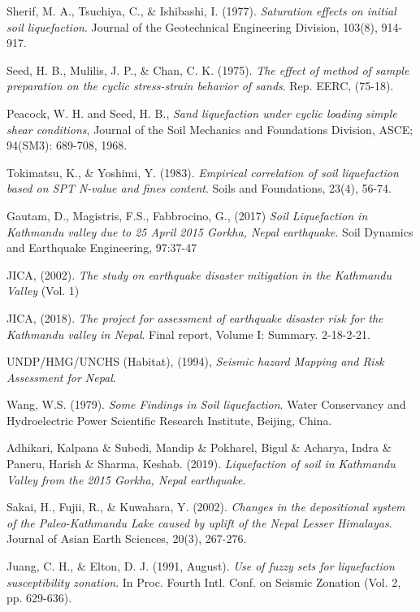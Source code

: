 \begin{thebibliography}{99}
Sherif, M. A., Tsuchiya, C., \& Ishibashi, I. (1977). \emph{Saturation effects on initial soil liquefaction}. Journal of the Geotechnical Engineering Division, 103(8), 914-917.

Seed, H. B., Mulilis, J. P., \& Chan, C. K. (1975). \emph{The effect of method of sample preparation on the cyclic stress-strain behavior of sands}. Rep. EERC, (75-18).

Peacock, W. H. and Seed, H. B., \emph{Sand liquefaction under cyclic loading simple shear conditions}, Journal of the Soil Mechanics and Foundations Division, ASCE; 94(SM3): 689-708, 1968.

Tokimatsu, K., \& Yoshimi, Y. (1983). \emph{Empirical correlation of soil liquefaction based on SPT N-value and fines content}. Soils and Foundations, 23(4), 56-74.

Gautam, D., Magistris, F.S., Fabbrocino, G., (2017) \emph{Soil Liquefaction in Kathmandu valley due to 25 April 2015 Gorkha, Nepal earthquake}. Soil Dynamics and Earthquake Engineering, 97:37-47

JICA, (2002). \emph{The study on earthquake disaster mitigation in the Kathmandu Valley} (Vol. 1)

JICA, (2018). \emph{The project for assessment of earthquake disaster risk for the Kathmandu valley in Nepal}. Final report, Volume I: Summary. 2-18-2-21.

UNDP/HMG/UNCHS (Habitat), (1994), \emph{Seismic hazard Mapping and Risk Assessment for Nepal}.

Wang, W.S. (1979). \emph{Some Findings in Soil liquefaction}. Water Conservancy and Hydroelectric Power Scientific Research Institute, Beijing, China.

Adhikari, Kalpana \& Subedi, Mandip \& Pokharel, Bigul \& Acharya, Indra \& Paneru, Harish \& Sharma, Keshab. (2019). \emph{Liquefaction of soil in Kathmandu Valley from the 2015 Gorkha, Nepal earthquake}.

Sakai, H., Fujii, R., \& Kuwahara, Y. (2002). \emph{Changes in the depositional system of the Paleo-Kathmandu Lake caused by uplift of the Nepal Lesser Himalayas}. Journal of Asian Earth Sciences, 20(3), 267-276.

Juang, C. H., \& Elton, D. J. (1991, August). \emph{Use of fuzzy sets for liquefaction susceptibility zonation}. In Proc. Fourth Intl. Conf. on Seismic Zonation (Vol. 2, pp. 629-636).


\end{thebibliography}
